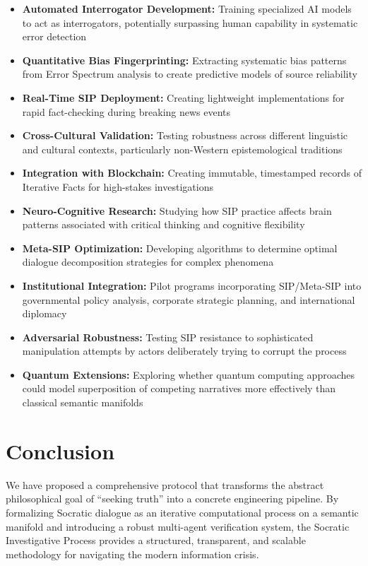 \documentclass[11pt,a4paper]{article}
\begin{document}
\begin{itemize}[leftmargin=*]
    \item \textbf{Automated Interrogator Development:} Training specialized AI models to act as interrogators, potentially surpassing human capability in systematic error detection
    \item \textbf{Quantitative Bias Fingerprinting:} Extracting systematic bias patterns from Error Spectrum analysis to create predictive models of source reliability
    \item \textbf{Real-Time SIP Deployment:} Creating lightweight implementations for rapid fact-checking during breaking news events
    \item \textbf{Cross-Cultural Validation:} Testing robustness across different linguistic and cultural contexts, particularly non-Western epistemological traditions
    \item \textbf{Integration with Blockchain:} Creating immutable, timestamped records of Iterative Facts for high-stakes investigations
    \item \textbf{Neuro-Cognitive Research:} Studying how SIP practice affects brain patterns associated with critical thinking and cognitive flexibility
    \item \textbf{Meta-SIP Optimization:} Developing algorithms to determine optimal dialogue decomposition strategies for complex phenomena
    \item \textbf{Institutional Integration:} Pilot programs incorporating SIP/Meta-SIP into governmental policy analysis, corporate strategic planning, and international diplomacy
    \item \textbf{Adversarial Robustness:} Testing SIP resistance to sophisticated manipulation attempts by actors deliberately trying to corrupt the process
    \item \textbf{Quantum Extensions:} Exploring whether quantum computing approaches could model superposition of competing narratives more effectively than classical semantic manifolds
\end{itemize}

\section{Conclusion}

We have proposed a comprehensive protocol that transforms the abstract philosophical goal of ``seeking truth'' into a concrete engineering pipeline. By formalizing Socratic dialogue as an iterative computational process on a semantic manifold and introducing a robust multi-agent verification system, the Socratic Investigative Process provides a structured, transparent, and scalable methodology for navigating the modern information crisis.
\end{document}
